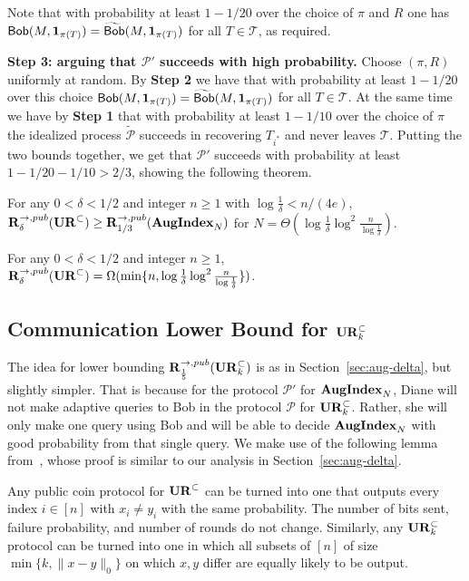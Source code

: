 Note that with probability at least $1-1/20$ over the choice of $\pi$ and $R$ one has $\mathsf{Bob}(M, \mathbf{1}_{\pi(T)})=\widetilde{\mathsf{Bob}}(M, \mathbf{1}_{\pi(T)})$ for all $T\in \mathcal{T}$, as required.


{\bf Step 3: arguing that $\mathcal{P}'$ succeeds with high probability.}  Choose $(\pi, R)$ uniformly at random. By {\bf Step 2} we have that with probability at least $1-1/20$ over this choice 
$\mathsf{Bob}(M, \mathbf{1}_{\pi(T)})=\widetilde{\mathsf{Bob}}(M, \mathbf{1}_{\pi(T)})$ for all $T\in \mathcal{T}$. At the same time we have by {\bf Step 1} that with probability at least $1-1/10$ over the choice of $\pi$ the idealized process $\widetilde{\mathcal{P}}$ 
succeeds in recovering $T_{i^*}$ and never leaves $\mathcal{T}$. Putting the two bounds together, we get that $\mathcal{P}'$ succeeds with probability at least $1-1/20-1/10>2/3$, showing the following theorem.


\begin{theorem}
For any $0<\delta<1/2$ and integer $n\ge 1$ with $\log \frac 1{\delta} < n/(4e)$, $\mathbf{R}^{\rightarrow,pub}_\delta(\mathbf{UR}^\subset) \ge \mathbf{R}^{\rightarrow,pub}_{1/3}(\mathbf{AugIndex}_N)$ for $N = \Theta(\log\frac 1{\delta} \log^2 \frac n{\log \frac 1{\delta}})$.
\end{theorem}

\begin{corollary}
For any $0<\delta<1/2$ and integer $n\ge 1$, $\mathbf{R}^{\rightarrow,pub}_\delta(\mathbf{UR}^\subset) = \Omega(\min\{n, \log\frac 1{\delta} \log^2 \frac n{\log \frac 1{\delta}}\})$.
\end{corollary}

\subsection{Communication Lower Bound for $\mathbf{UR}_k^\subset$}\label{sec:aug-k}

The idea for lower bounding $\mathbf{R}^{\rightarrow,pub}_{\frac 15}(\mathbf{UR}_k^\subset)$ is as in Section~\ref{sec:aug-delta}, but slightly simpler. That is because for the protocol $\mathcal P'$ for $\mathbf{AugIndex}_N$, Diane will not make adaptive queries to Bob in the protocol $\mathcal P$ for $\mathbf{UR}_k^\subset$. Rather, she will only make one query using Bob and will be able to decide $\mathbf{AugIndex}_N$ with good probability from that single query. We  make use of the following lemma from~\cite{JowhariST11}, whose proof is similar to our analysis in Section~\ref{sec:aug-delta}.

\begin{lemma}{\cite{JowhariST11}}\label{lem:rand-ur}
Any public coin protocol for $\mathbf{UR}^\subset$ can be turned into one that outputs every index $i\in[n]$ with $x_i\neq y_i$ with the same probability. The number of bits sent, failure probability, and number of rounds do not change. Similarly, any $\mathbf{UR}_k^\subset$ protocol can be turned into one in which all subsets of $[n]$ of size $\min\{k, \|x-y\|_0\}$ on which $x, y$ differ are equally likely to be output.
\end{lemma}

